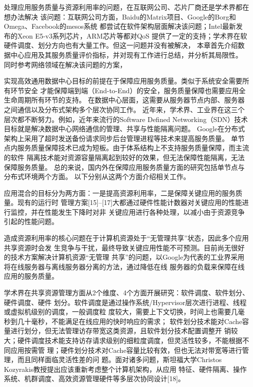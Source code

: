 处理应用服务质量与资源利用率的问题，在互联网公司、芯片厂商还是学术界都在想办法解决
该问题：互联网公司方面，Baidu的Matrix项目、Google的Borg和Omega、Facebook的mesos系统
都尝试在软件架构层面解决该问题；Intel最新发布的Xeon E5-v3系列芯片，ARM芯片等都对QoS
提供了一定的支持；学术界在软硬件调度、划分方向也有大量工作。但这一问题并没有被解决，
本章首先介绍数据中心应用及其服务质量评价指标，并对现有工作进行总结，并分析其局限性。
同时参考网络领域在解决该问题的方案，

实现高效通用数据中心目标的前提在于保障应用服务质量。类似于系统安全需要所有环节安全
才能保障端到端（End-to-End）的安全，服务质量保障也需要应用全生命周期所有环节的支持。
在数据中心层面，这需要从服务器节点内部、服务器之间通信以及分布式架构多个层次协同工作。
近年来，学术界、工业界在这三个层次都不断努力。例如，近年来流行的Software Defined
Networking（SDN）技术\cite{SDN}目标就是解决数据中心网络通信的管理、共享与性能隔离问题。
Google在分布式架构上采用了超时发送备份请求同步后台管理进程等技术\cite{dean_achieving_2012}来提高服务质量。
单节点内服务质量保障技术已成为短板。由于体系结构上不支持服务质量保障，而主流的软件
隔离技术能对资源容量隔离起到较好的效果，但无法保障性能隔离，无法保障服务质量。
总的来说，国内外在保障应用服务质量方面的研究包括单节点与分布式环境两个方面。
以下分别从这两个方面介绍相关工作。


应用混合的目标分为两方面：一是提高资源利用率，二是保障关键应用的服务质量。现有的运行时
管理方案[15]–[17]大都通过硬件性能计数器对关键应用的性能进行监控，并在性能发生下降时对非
关键应用进行各种处理，以减小由于资源竞争引起的性能问题。

造成资源利用率的核心问题在于计算机资源处于``无管理共享''状态，因此多个应用共享资源时会发
生竞争与干扰，最终导致关键应用性能不可预测。目前尚无很好的技术方案解决计算机资源``无管理
共享''的问题，以Google为代表的工业界采用将在线服务器与离线服务器分离的方法，通过降低在线
服务器的负载来保障在线应用的服务质量。

学术界在共享资源管理方面从2个维度、4个方面开展研究：软件调度、软件划分、硬件调度、硬件
划分。软件调度是通过操作系统/Hypervisor层次进行进程、线程或虚拟机级别的调度，一般调度粒
度较大，需要上下文切换，时间上也需要几毫秒到几十毫秒，不能满足在线应用的快时响应的需求；
软件划分技术能对Cache容量进行划分，但无法管理访存带宽这类资源，且软件划分技术配置调整开
销较大；硬件调度技术能支持访存请求级别的细粒度调度，但灵活性较多，不能根据不同应用按需管
理；硬件划分技术对Cache容量比较有效，但也无法对带宽等进行管理，而且同样面临灵活性差的问
题。面对诸多问题，斯坦福大学Christos Kozyrakis教授提出应该重新考虑整个计算机架构，从应用
特征、硬件隔离、操作系统、机群调度、高效资源管理硬件等多层次协同设计[18]。

